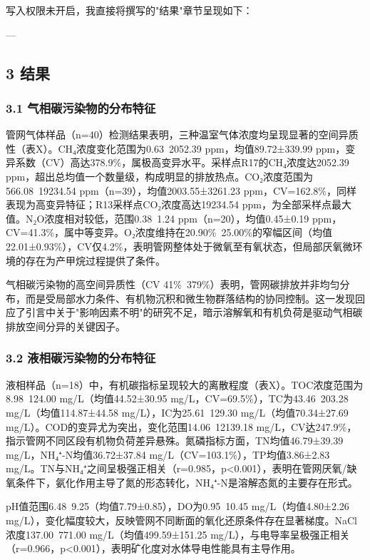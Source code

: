 写入权限未开启，我直接将撰写的"结果"章节呈现如下：

---

\subsection{3 结果}

\subsubsection{3.1 气相碳污染物的分布特征}

管网气体样品（n=40）检测结果表明，三种温室气体浓度均呈现显著的空间异质性（表X）。CH₄浓度变化范围为0.63~2052.39 ppm，均值89.72±339.99 ppm，变异系数（CV）高达378.9\%，属极高变异水平。采样点R17的CH₄浓度达2052.39 ppm，超出总均值一个数量级，构成明显的排放热点。CO₂浓度范围为566.08~19234.54 ppm（n=39），均值2003.55±3261.23 ppm，CV=162.8\%，同样表现为高变异特征；R13采样点CO₂浓度高达19234.54 ppm，为全部采样点最大值。N₂O浓度相对较低，范围0.38~1.24 ppm（n=20），均值0.45±0.19 ppm，CV=41.3\%，属中等变异。O₂浓度维持在20.90\%~25.00\%的窄幅区间（均值22.01±0.93\%），CV仅4.2\%，表明管网整体处于微氧至有氧状态，但局部厌氧微环境的存在为产甲烷过程提供了条件。

气相碳污染物的高空间异质性（CV 41\%~379\%）表明，管网碳排放并非均匀分布，而是受局部水力条件、有机物沉积和微生物群落结构的协同控制。这一发现回应了引言中关于"影响因素不明"的研究不足，暗示溶解氧和有机负荷是驱动气相碳排放空间分异的关键因子。

\subsubsection{3.2 液相碳污染物的分布特征}

液相样品（n=18）中，有机碳指标呈现较大的离散程度（表X）。TOC浓度范围为8.98~124.00 mg/L（均值44.52±30.95 mg/L，CV=69.5\%），TC为43.46~203.28 mg/L（均值114.87±44.58 mg/L），IC为25.61~129.30 mg/L（均值70.34±27.69 mg/L）。COD的变异尤为突出，变化范围14.06~12139.18 mg/L，CV达247.9\%，指示管网不同区段有机物负荷差异悬殊。氮磷指标方面，TN均值46.79±39.39 mg/L，NH₄⁺-N均值36.72±37.84 mg/L（CV=103.1\%），TP均值3.86±2.83 mg/L。TN与NH₄⁺之间呈极强正相关（r=0.985，p<0.001），表明在管网厌氧/缺氧条件下，氨化作用主导了氮的形态转化，NH₄⁺-N是溶解态氮的主要存在形式。

pH值范围6.48~9.25（均值7.79±0.85），DO为0.95~10.45 mg/L（均值4.80±2.26 mg/L），变化幅度较大，反映管网不同断面的氧化还原条件存在显著梯度。NaCl浓度137.00~771.00 mg/L（均值499.59±151.25 mg/L），与电导率呈极强正相关（r=0.966，p<0.001），表明矿化度对水体导电性能具有主导作用。

